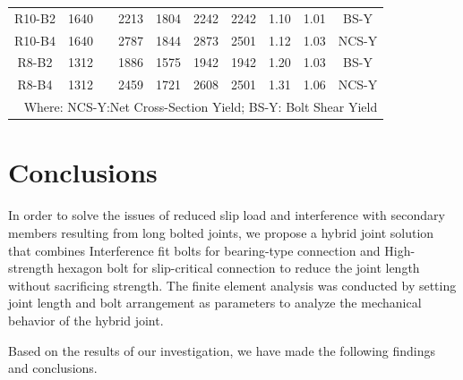 \begin{table}[htbp]
{\begin{tabular}{@{}cccccccccc@{}}
R10-B2    & 1640 &                       & 2213 & 1804 & 2242 & 2242 & 1.10 & 1.01 & BS-Y    \\
R10-B4    & 1640 &                       & 2787 & 1844 & 2873 & 2501 & 1.12 & 1.03 & NCS-Y \\
R8-B2     & 1312 &                       & 1886 & 1575 & 1942 & 1942 & 1.20 & 1.03 & BS-Y    \\
R8-B4     & 1312 &                       & 2459 & 1721 & 2608 & 2501 & 1.31 & 1.06 & NCS-Y \\ \bottomrule
\multicolumn{10}{r}{Where: NCS-Y:Net Cross-Section Yield; BS-Y: Bolt Shear Yield}
\end{tabular}}
\end{table}



\section{Conclusions}

In order to solve the issues of reduced slip load and interference with secondary members resulting from long bolted joints, we propose a hybrid joint solution that combines Interference fit bolts for bearing-type connection and High-strength hexagon bolt for slip-critical connection to reduce the joint length without sacrificing strength. The finite element analysis was conducted by setting joint length and bolt arrangement as parameters to analyze the mechanical behavior of the hybrid joint. 

Based on the results of our investigation, we have made the following findings and conclusions. \par

